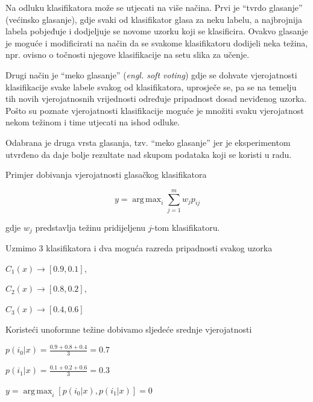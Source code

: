 \documentclass[times, utf8, zavrsni]{fer}
\DeclareMathOperator*{\argmax}{arg\,max}
\begin{document}
\bigbreak

Na odluku klasifikatora može se utjecati
na više načina. Prvi je \enquote{tvrdo glasanje} (većinsko glasanje), gdje
svaki od klasifikator glasa za neku labelu, a najbrojnija labela pobjeđuje 
i dodjeljuje se novome uzorku koji se klasificira. Ovakvo glasanje je moguće i 
modificirati na način da se svakome klasifikatoru dodijeli neka težina, 
npr. ovisno o točnosti njegove klasifikacije na setu slika za učenje.

\bigbreak

Drugi način je \enquote{meko glasanje} (\textit{engl. soft voting}) gdje
se dohvate vjerojatnosti klasifikacije svake labele svakog od klasifikatora,
uprosječe se, pa se na temelju tih novih vjerojatnosnih vrijednosti određuje
pripadnost dosad neviđenog uzorka. Pošto su poznate vjerojatnosti klasifikacije
moguće je množiti svaku vjerojatnost nekom težinom i time utjecati na ishod odluke.

\bigbreak

Odabrana je druga vrsta glasanja, tzv. \enquote{meko glasanje} jer je eksperimentom
utvrđeno da daje bolje rezultate nad skupom podataka koji se koristi u radu.  

\newpage

Primjer dobivanja vjerojatnosti glasačkog klasifikatora

\[y = \argmax_i \sum_{j=1}^mw_jp_{ij}\]

gdje \(w_j\) predstavlja težinu pridijeljenu \(j\)-tom klasifikatoru.

\bigbreak

Uzmimo 3 klasifikatora i dva moguća razreda pripadnosti svakog uzorka 

\begin{center}
\(C_1(x) \rightarrow [0.9,0.1]\),
\end{center}
\begin{center}
\(C_2(x) \rightarrow [0.8,0.2]\),
\end{center}
\begin{center}
\(C_3(x) \rightarrow [0.4,0.6]\)
\end{center}

Koristeći unoformne težine dobivamo sljedeće srednje vjerojatnosti
\begin{center}
\(p(i_0|x)=\frac{0.9+0.8+0.4}{3}=0.7\)

\(p(i_1|x)=\frac{0.1+0.2+0.6}{3}=0.3\)

\(y=\argmax_i [p(i_0|x),p(i_1|x)]=0\)
\end{center}
\end{document}
